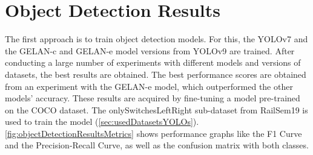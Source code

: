 \section{Object Detection Results}
\label{sec:objectDetectionResults}

The first approach is to train object detection models.
For this, the \ac{YOLO}v7 and the \ac{GELAN}-c and \ac{GELAN}-e model versions from \ac{YOLO}v9 are trained.
After conducting a large number of experiments with different models and versions of datasets, the best results are obtained.
The best performance scores are obtained from an experiment with the \ac{GELAN}-e model, which outperformed the other models' accuracy.
These results are acquired by fine-tuning a model pre-trained on the COCO dataset.
The onlySwitchesLeftRight sub-dataset from RailSem19 is used to train the model (\autoref{sec:usedDatasetsYOLOs}).
\autoref{fig:objectDetectionResultsMetrics} shows performance graphs like the F1 Curve and the Precision-Recall Curve, as well as the confusion matrix with both classes.

\vspace{0.5cm}

